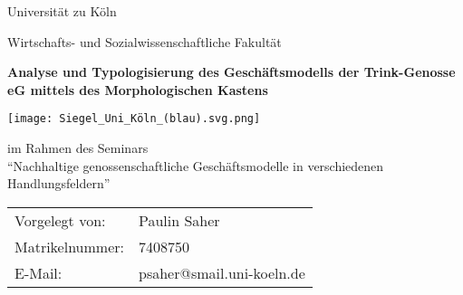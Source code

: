 \begin{titlepage}
\centering



\vspace{1cm}

{\Large Universität zu Köln}

\vspace{1cm}

{\large Wirtschafts- und Sozialwissenschaftliche Fakultät}

\vspace{2cm}

{\huge\bfseries Analyse und Typologisierung des Geschäftsmodells der Trink-Genosse eG mittels des Morphologischen Kastens}

\vspace{1cm}

\texttt{[image: Siegel\_Uni\_Köln\_(blau).svg.png]}

\vspace{1cm}

{\large im Rahmen des Seminars\\
\enquote{Nachhaltige genossenschaftliche Geschäftsmodelle in verschiedenen Handlungsfeldern}}

\vspace{3cm}

\begin{tabular}{ll}
Vorgelegt von: & Paulin Saher \\
Matrikelnummer: & 7408750 \\
E-Mail: & psaher@smail.uni-koeln.de \\
\end{tabular}

\vspace{2cm}

\end{titlepage}
\newpage
